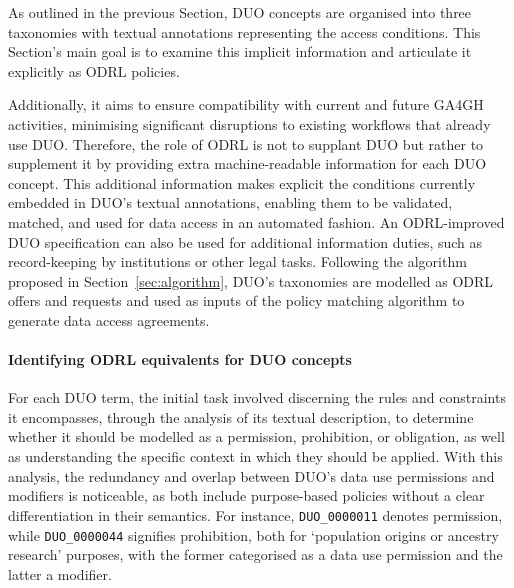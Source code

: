 As outlined in the previous Section, DUO concepts are organised into three taxonomies with textual annotations representing the access conditions.
This Section's main goal is to examine this implicit information and articulate it explicitly as ODRL policies.

Additionally, it aims to ensure compatibility with current and future GA4GH activities, minimising significant disruptions to existing workflows that already use DUO.
Therefore, the role of ODRL is not to supplant DUO but rather to supplement it by providing extra machine-readable information for each DUO concept.
This additional information makes explicit the conditions currently embedded in DUO's textual annotations, enabling them to be validated, matched, and used for data access in an automated fashion.
An ODRL-improved DUO specification can also be used for additional information duties, such as record-keeping by institutions or other legal tasks.
Following the algorithm proposed in Section~\ref{sec:algorithm}, DUO's taxonomies are modelled as ODRL offers and requests and used as inputs of the policy matching algorithm to generate data access agreements.

\paragraph{Identifying ODRL equivalents for DUO concepts}
For each DUO term, the initial task involved discerning the rules and constraints it encompasses, through the analysis of its textual description, to determine whether it should be modelled as a permission, prohibition, or obligation, as well as understanding the specific context in which they should be applied.
With this analysis, the redundancy and overlap between DUO's data use permissions and modifiers is noticeable, as both include purpose-based policies without a clear differentiation in their semantics.
For instance, \texttt{DUO\_0000011} denotes permission, while \texttt{DUO\_0000044} signifies prohibition, both for `population origins or ancestry research' purposes, with the former categorised as a data use permission and the latter a modifier.

